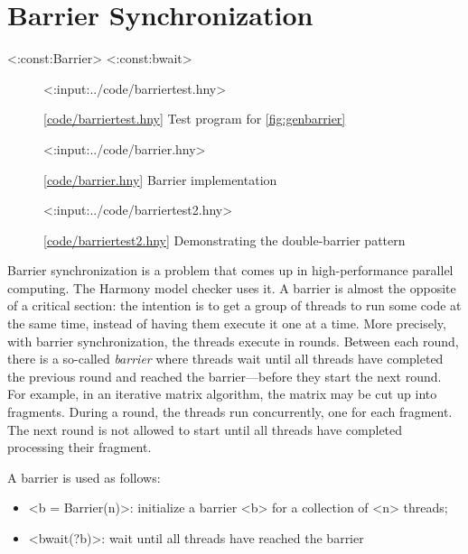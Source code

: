 \documentclass{report}
\newcommand{\harmonylink}[1]{%
[\href{https://harmony.cs.cornell.edu/#1}{\underline{#1}}]%
}
\newenvironment{code}{
\tcolorbox
}{
\endtcolorbox
}
\begin{document}
\chapter{Barrier Synchronization}
\label{ch:barrier}
%

<{:const:Barrier}>
<{:const:bwait}>

\begin{figure}
\begin{code}
<{:input:../code/barriertest.hny}>
\end{code}
\caption{\harmonylink{code/barriertest.hny} Test program for \autoref{fig:genbarrier}}
\label{fig:barriertest}
\end{figure}

\begin{figure}
\begin{code}
<{:input:../code/barrier.hny}>
\end{code}
\caption{\harmonylink{code/barrier.hny} Barrier implementation}
\label{fig:genbarrier}
\end{figure}

\begin{figure}
\begin{code}
<{:input:../code/barriertest2.hny}>
\end{code}
\caption{\harmonylink{code/barriertest2.hny} Demonstrating the double-barrier pattern}
\label{fig:barriertest2}
\end{figure}

%

Barrier synchronization is a problem that comes up in high-performance
parallel computing.
The Harmony model checker uses it.
A barrier is almost the opposite of a critical section:
the intention is to get a group of threads to run some code at the
same time, instead of having them execute it one at a time.
More precisely, with barrier synchronization, the threads execute in rounds.
Between each round, there is a so-called \emph{barrier} where threads wait
until all threads have completed the previous round and reached the
barrier---before they start the next round.
For example, in an iterative matrix algorithm, the matrix may be
cut up into fragments.  During a round, the threads run concurrently,
one for each fragment.  The next round is not allowed to start
until all threads have completed processing their fragment.

A barrier is used as follows:
\begin{itemize}
\item <{b = Barrier(n)}>: initialize a barrier <{b}> for a collection of
<{n}> threads;
\item <{bwait(?b)}>: wait until all threads have reached the barrier
\end{itemize}
\end{document}
